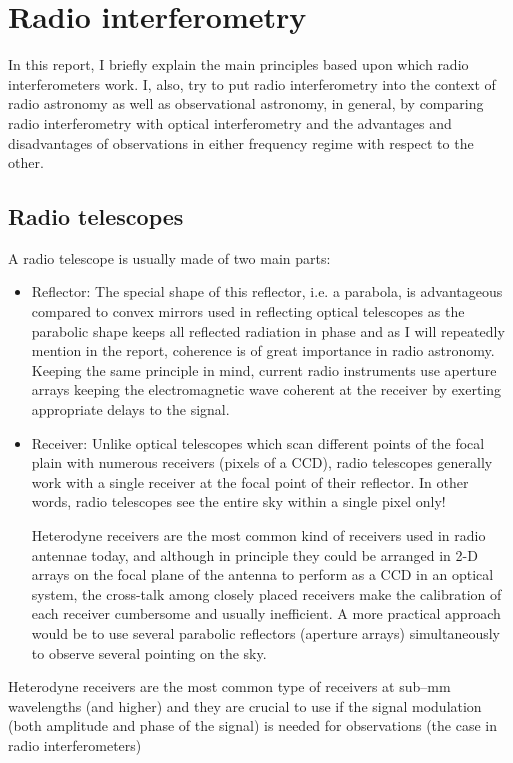 \documentclass[paper=a4, fontsize=11pt]{scrartcl} %
\numberwithin{equation}{section} %
\numberwithin{figure}{section} %
\numberwithin{table}{section} %
\begin{document}
\section{Radio interferometry}
In this report, I briefly explain the main principles based upon which radio interferometers work. I, also, try to put radio interferometry into the context of radio astronomy as well as observational astronomy, in general, by comparing radio interferometry with optical interferometry and the advantages and disadvantages of observations in either frequency regime with respect to the other.

\subsection{Radio telescopes}
A radio telescope is usually made of two main parts:
\begin{itemize}
\item Reflector: The special shape of this reflector, i.e. a parabola, is advantageous compared to convex mirrors used in reflecting optical telescopes as the parabolic shape keeps all reflected radiation  in phase and as I will repeatedly mention in the report, coherence is of great importance in radio astronomy. Keeping the same principle in mind, current radio instruments use aperture arrays keeping the electromagnetic wave coherent at the receiver by exerting appropriate delays to the signal.
\item Receiver: Unlike optical telescopes which scan different points of the focal plain with numerous receivers (pixels of a CCD), radio telescopes generally work with a single receiver at the focal point of their reflector. In other words, radio telescopes see the entire sky within a single pixel only!

Heterodyne receivers are the most common kind of receivers used in radio antennae today, and although in principle they could be arranged in 2-D arrays on the focal plane of the antenna to perform as a CCD in an optical system, the cross-talk among closely placed receivers make the calibration of each receiver cumbersome and usually inefficient. A more practical approach would be to use several parabolic reflectors (aperture arrays) simultaneously to observe several pointing on the sky.
\end{itemize}
Heterodyne receivers are the most common type of receivers at sub--mm wavelengths (and higher) and they are crucial to use if the signal modulation (both amplitude and phase of the signal) is needed for observations (the case in radio interferometers)\\
\end{document}
